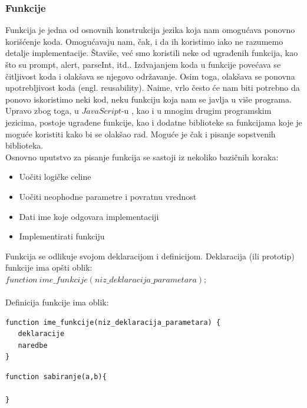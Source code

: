 \documentclass[a4paper]{article}
\begin{document}
\subsubsection{Funkcije}
Funkcija je jedna od osnovnih konstrukcija jezika koja nam omogućava ponovno korišćenje koda. Omogućavaju nam, čak, i da ih koristimo iako ne razumemo detalje implementacije. Štaviše, već smo koristili neke od ugrađenih funkcija, kao što su prompt, alert, parseInt, itd.. Izdvajanjem koda u funkcije povećava se čitljivost koda i olakšava se njegovo održavanje. Osim toga, olakšava se ponovna upotrebljivost koda (engl. reusability). Naime, vrlo često će nam biti potrebno da ponovo iskoristimo neki kod, neku funkciju koja nam se javlja u više programa. Upravo zbog toga, u $JavaScript$-u , kao i u mnogim drugim programskim jezicima, postoje ugrađene funkcije, kao i dodatne biblioteke sa funkcijama koje je moguće koristiti kako bi se olakšao rad. Moguće je čak i pisanje sopstvenih biblioteka.    
\\
Osnovno uputstvo za pisanje funkcija se sastoji iz nekoliko bazičnih koraka:
\begin{itemize}
\item Uočiti logičke celine
\item Uočiti neophodne parametre i povratnu vrednost 
\item Dati ime koje odgovara implementaciji
\item Implementirati funkciju
\end{itemize}

Funkcija se odlikuje svojom deklaracijom i definicijom.
Deklaracija (ili prototip) funkcije ima opšti oblik:\\
$function\ ime\_funkcije(niz\_deklaracija\_parametara);$\\\\
Definicija funkcije ima oblik:
\begin{verbatim}
function ime_funkcije(niz_deklaracija_parametara) {
   deklaracije
   naredbe
}
\end{verbatim}
\begin{lstlisting}[backgroundcolor = \color{lightgray}]
function sabiranje(a,b){

}
\end{lstlisting}
\end{document}
